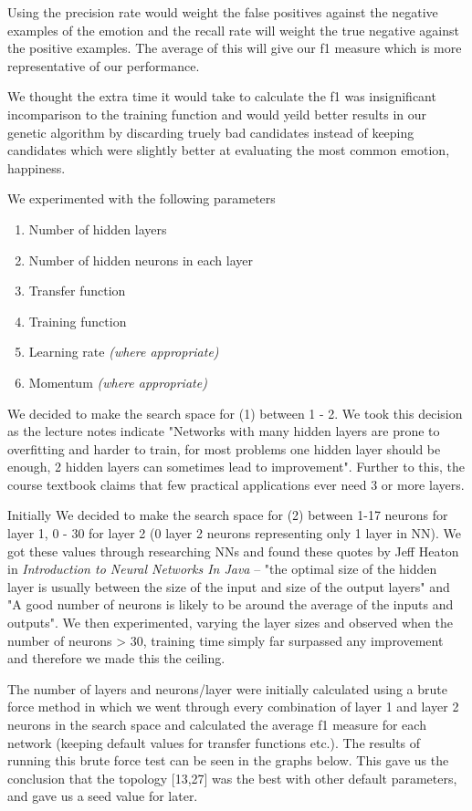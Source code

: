\documentclass[11pt]{article}
\begin{document}
Using the precision rate would weight the false positives against the negative examples of the emotion and the recall rate will weight the true negative against the positive examples. The average of this will give our f1 measure which is more representative of our performance. 

We thought the extra time it would take to calculate the f1 was insignificant incomparison to the training function and would yeild better results in our genetic algorithm by discarding truely bad candidates instead of keeping candidates which were slightly better at evaluating the most common emotion, happiness.

We experimented with the following parameters
\begin{enumerate}
  \item Number of hidden layers
  \item Number of hidden neurons in each layer
  \item Transfer function
  \item Training function
  \item Learning rate \emph{(where appropriate)}
  \item Momentum \emph{(where appropriate)}
\end{enumerate}

We decided to make the search space for (1) between 1 - 2. We took this decision as the lecture notes indicate "Networks with many hidden layers are prone to overfitting and harder to train, for most problems one hidden layer should be enough, 2 hidden layers can sometimes lead to improvement". Further to this, the course textbook claims that few practical applications ever need 3 or more layers.

Initially We decided to make the search space for (2) between 1-17 neurons for layer 1, 0 - 30 for layer 2 (0 layer 2 neurons representing only 1 layer in NN). We got these values through researching NNs and found these quotes by Jeff Heaton in \emph{Introduction to Neural Networks In Java} -- "the optimal size of the hidden layer is usually between the size of the input and size of the output layers" and "A good number of neurons is likely to be around the average of the inputs and outputs". We then experimented, varying the layer sizes and observed when the number of neurons > 30, training time simply far surpassed any improvement and therefore we made this the ceiling.

The number of layers and neurons/layer were initially calculated using a brute force method in which we went through every combination of layer 1 and layer 2 neurons in the search space and calculated the average f1 measure for each network (keeping default values for transfer functions etc.). The results of running this brute force test can be seen in the graphs below. This gave us the conclusion that the topology [13,27] was the best with other default parameters, and gave us a seed value for later.
\end{document}
